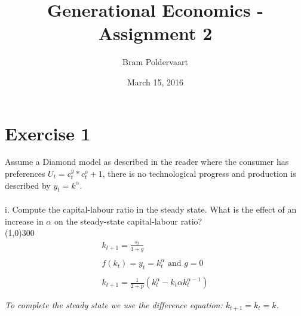 \documentclass{article}
\begin{document}
%	
\title{Generational Economics - Assignment 2}
\author{Bram Poldervaart}
\date{March 15, 2016}
\maketitle

\section{Exercise 1}\label {sec:ex1}
Assume a Diamond model as described in the reader where the consumer has preferences $U_t = c^y_t*c^o_t+1$, there is no technological progress and production is described by $y_t = k^\alpha$.
\\
\\
i. Compute the capital-labour ratio in the steady state. What is the effect of an increase in $\alpha$ on the steady-state capital-labour ratio?\\
\line(1,0){300} \\
\begin{eqnarray} 
k_{t+1}= \frac{s_t }{1+g}  \nonumber \\
\nonumber \\ 
f(k_t)=y_t = k^\alpha_t \mbox{ and } g=0 \nonumber \\
\nonumber \\
k_{t+1} = \frac {1}{2+p} (k^\alpha_t - k_t\alpha k_t^{\alpha-1}) \nonumber 
\end{eqnarray}

\textit{To complete the steady state we use the difference equation: $k_{t+1} = k_t = k$.} \\
\end{document}
